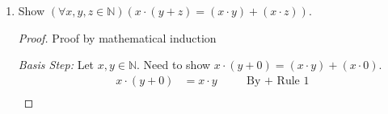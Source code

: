 \documentclass{article}
\newcommand{\naturals}{\mathbb{N}}
\newcommand{\s}{\mathbb{S}}
\newenvironment{case}[1][Case]
    {\par\textit{#1:}\hfill\break}
    {}
\begin{document}
\begin{enumerate}
\begin{enumerate}
\begin{proof}
        \end{proof}
      \item
        Show $(\forall x, y \in \naturals)(x + \s(y) = \s(y) + x)$.
        \begin{proof}
        Let $x,y \in \naturals$ and assume that $x+y=y+x$.\\
        Need to show $x + \s(y) = \s(y) + x$
        \begin{align*}
          x+\s(y)
            &=\s(x+y)
            &\quad
            &\text{By $+$ Rule 2}
              \\
            &=\s(y+x)
            &\quad
            &\text{By IH}
              \\
            &=y+\s(x)
            &\quad
            &\text{By $+$ Rule 2}
              \\
            &=y+1+x
            &\quad
            &\text{By Theorem 2}
            \\
            &=\s(y)+x
            &\quad
            &\text{By Theorem 1}
        \end{align*} 
        \end{proof}
      \item
        Show $(\forall x, y \in \naturals)(x + y = y + x)$.
        \begin{proof} Proof by mathematical induction.\\\\
        \emph{Basis Step:} We can conclude $x+0=0+x$ by 3a\\
        \emph{Inductive Step:} We can conclude $x + \s(y) = \s(y) + x$ by 3b\\\\
        Thus by mathematical induction, we can conclude $(\forall x, y \in \naturals)(x + y = y + x)$.\\  
        \end{proof}
    \end{enumerate}
\pagebreak
  \item Show $(\forall x, y, z \in \naturals)(x \cdot (y + z) = (x \cdot y) + (x \cdot z))$.
    \begin{proof}
    Proof by mathematical induction
    \begin{case}[Basis Step]
    Let $x,y \in \naturals$.
    Need to show $x \cdot (y + 0) = (x \cdot y) + (x \cdot 0)$.
    \begin{align*}
      x \cdot (y + 0)
        &=x \cdot y
        &\quad
        &\text{By $+$ Rule 1}
          \\

\end{align*}
\end{case}
\end{proof}
\end{enumerate}
\end{document}
